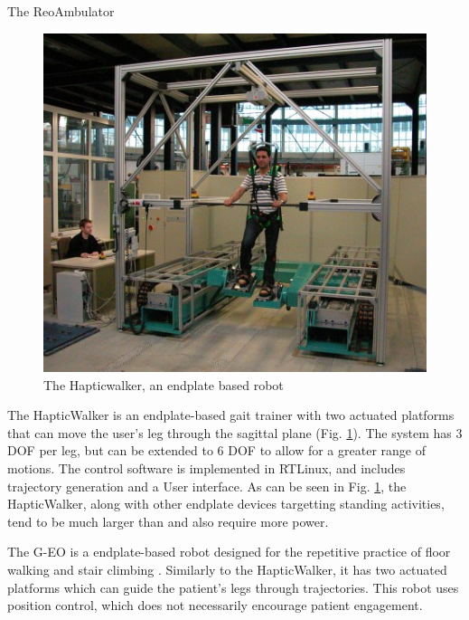 \documentclass[12pt]{report}
\begin{document}
	The ReoAmbulator
	
	
	
	\begin{figure}[h] 
		\centering
		\includegraphics[width=0.75\linewidth]{Hapticwalker}
		\caption{The Hapticwalker, an endplate based robot}
		\label{fig:Hapticwalker}
	\end{figure}
	
	The HapticWalker \cite{Schmidt2005} is an endplate-based gait trainer with two actuated platforms that can move the user's leg through the sagittal plane (Fig. \ref{fig:Hapticwalker}). The system has 3 DOF per leg, but can be extended to 6 DOF to allow for a greater range of motions. The control software is implemented in RTLinux, and includes trajectory generation and a User interface. As can be seen in Fig. \ref{fig:Hapticwalker}, the HapticWalker, along with other endplate devices targetting standing activities, tend to be much larger than and also require more power.
	
	The G-EO is a endplate-based robot designed for the repetitive practice of floor walking and stair climbing \cite{Hesse2010}. Similarly to the HapticWalker, it has two actuated platforms which can guide the patient's legs through trajectories. This robot uses position control, which does not necessarily encourage patient engagement. 
	
\end{document}
